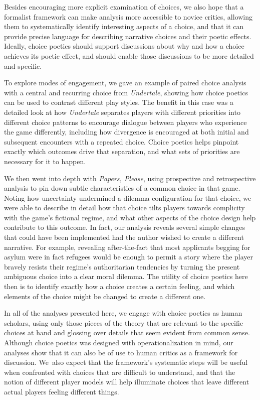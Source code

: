\documentclass[arts,article,accept,moreauthors,pdftex,10pt,a4paper]{Definitions/mdpi}
\begin{document}
Besides encouraging more explicit examination of choices, we also hope that a formalist framework can make analysis more accessible to novice critics, allowing them to systematically identify interesting aspects of a choice, and that it can provide precise language for describing narrative choices and their poetic effects.
%
Ideally, choice poetics should support discussions about why and how a choice achieves its poetic effect, and should enable those discussions to be more detailed and specific.


To explore modes of engagement, we gave an example of paired choice analysis with a central and recurring choice from \emph{Undertale}, showing how choice poetics can be used to contrast different play styles.
%
The benefit in this case was a detailed look at how \emph{Undertale} separates players with different priorities into different choice patterns to encourage dialogue between players who experience the game differently, including how divergence is encouraged at both initial and subsequent encounters with a repeated choice.
%
Choice poetics helps pinpoint exactly which outcomes drive that separation, and what sets of priorities are necessary for it to happen.


We then went into depth with \emph{Papers, Please}, using prospective and retrospective analysis to pin down subtle characteristics of a common choice in that game.
%
Noting how uncertainty undermined a dilemma configuration for that choice, we were able to describe in detail how that choice tilts players towards complicity with the game's fictional regime, and what other aspects of the choice design help contribute to this outcome.
%
In fact, our analysis reveals several simple changes that could have been implemented had the author wished to create a different narrative.
%
For example, revealing after-the-fact that most applicants begging for asylum were in fact refugees would be enough to permit a story where the player bravely resists their regime's authoritarian tendencies by turning the present ambiguous choice into a clear moral dilemma.
%
The utility of choice poetics here then is to identify exactly how a choice creates a certain feeling, and which elements of the choice might be changed to create a different one.


In all of the analyses presented here, we engage with choice poetics as human scholars, using only those pieces of the theory that are relevant to the specific choices at hand and glossing over details that seem evident from common sense.
%
Although choice poetics was designed with operationalization in mind, our analyses show that it can also be of use to human critics as a framework for discussion.
%
We~also expect that the framework's systematic steps will be useful when confronted with choices that are difficult to understand, and that the notion of different player models will help illuminate choices that leave different actual players feeling different things.
\end{document}
